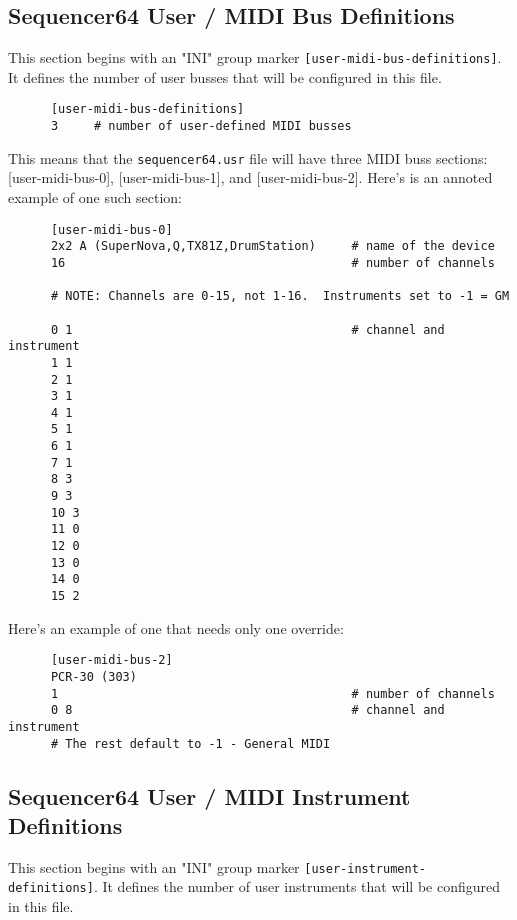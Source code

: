 \subsection{Sequencer64 User / MIDI Bus Definitions}
\label{subsec:seq64_usr_file_midi_bus_definitions}

   This section begins with an
   "INI" group marker \texttt{[user-midi-bus-definitions]}.
   It defines the number of user busses that will be configured in this file.

   \begin{verbatim}
      [user-midi-bus-definitions]
      3     # number of user-defined MIDI busses
   \end{verbatim}

   This means that the \texttt{sequencer64.usr} file will have three MIDI buss
   sections: [user-midi-bus-0], [user-midi-bus-1], and [user-midi-bus-2].
   Here's is an annoted example of one such section:

   \begin{verbatim}
      [user-midi-bus-0]
      2x2 A (SuperNova,Q,TX81Z,DrumStation)     # name of the device
      16                                        # number of channels

      # NOTE: Channels are 0-15, not 1-16.  Instruments set to -1 = GM

      0 1                                       # channel and instrument
      1 1 
      2 1
      3 1
      4 1
      5 1
      6 1
      7 1
      8 3
      9 3
      10 3
      11 0
      12 0
      13 0
      14 0
      15 2
   \end{verbatim}

   Here's an example of one that needs only one override:

   \begin{verbatim}
      [user-midi-bus-2]
      PCR-30 (303)
      1                                         # number of channels
      0 8                                       # channel and instrument
      # The rest default to -1 - General MIDI
   \end{verbatim}

\subsection{Sequencer64 User / MIDI Instrument Definitions}
\label{subsec:seq64_usr_file_midi_instrument_definitions}

   This section begins with an
   "INI" group marker \texttt{[user-instrument-definitions]}.
   It defines the number of user instruments that will be configured in this
   file.

